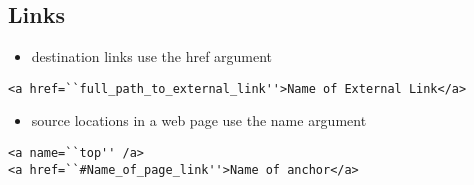 \documentclass{article}
\begin{document}
\subsection{Links}
\begin{itemize}
  \item destination links use the href argument
\end{itemize}

\begin{lstlisting}
<a href=``full_path_to_external_link''>Name of External Link</a>
\end{lstlisting}

\begin{itemize}
  \item source locations in a web page use the name argument
\end{itemize}

\begin{lstlisting}
<a name=``top'' /a>
<a href=``#Name_of_page_link''>Name of anchor</a>
\end{lstlisting}

\end{document}
